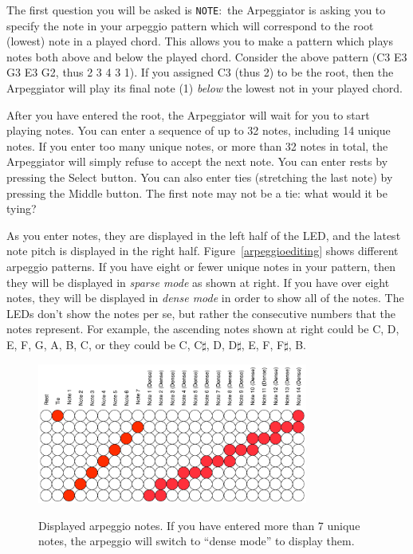 \documentclass{article}
\begin{document}
The first question you will be asked is \texttt{NOTE}:\ the Arpeggiator is asking you to specify the note in your arpeggio pattern which will correspond to the root (lowest) note in a played chord.  This allows you to make a pattern which plays notes both above and below the played chord.  Consider the above pattern (C3 E3 G3 E3 G2, thus 2 3 4 3 1).  If you assigned C3 (thus 2) to be the root, then the Arpeggiator will play its final note (1) {\it below} the lowest not in your played chord.

After you have entered the root, the Arpeggiator will wait for you to start playing notes.  You can enter a sequence of up to 32 notes, including 14 unique notes.  If you enter too many unique notes, or more than 32 notes in total, the Arpeggiator will simply refuse to accept the next note.  You can enter rests by pressing the Select button.  You can also enter ties (stretching the last note) by pressing the Middle button.  The first note may not be a tie: what would it be tying?

As you enter notes, they are displayed in the left half of the LED, and the latest note pitch is displayed in the right half. Figure~\ref{arpeggioediting} shows different arpeggio patterns.  If you have eight or fewer unique notes in your pattern, then they will be displayed in {\it sparse mode} as shown at right.  If you have over eight notes, they will be displayed in {\it dense mode} in order to show all of the notes.  The LEDs don't show the notes per se, but rather the consecutive numbers that the notes represent.  For example, the ascending notes shown at right could be C, D, E, F, G, A, B, C, or they could be C, C\(\sharp\), D, D\(\sharp\), E, F, F\(\sharp\), B.

\begin{figure}
\begin{center}
\vspace{-2.5em}
\includegraphics[width=3.5in]{arpeggionotes.pdf}\\
\end{center}
\vspace{-1em}\caption{Displayed arpeggio notes.  If you have entered more than 7 unique notes, the arpeggio will switch to ``dense mode'' to display them.}
\vspace{-1em}
\label{arpeggionotes}
\end{figure}
\end{document}
